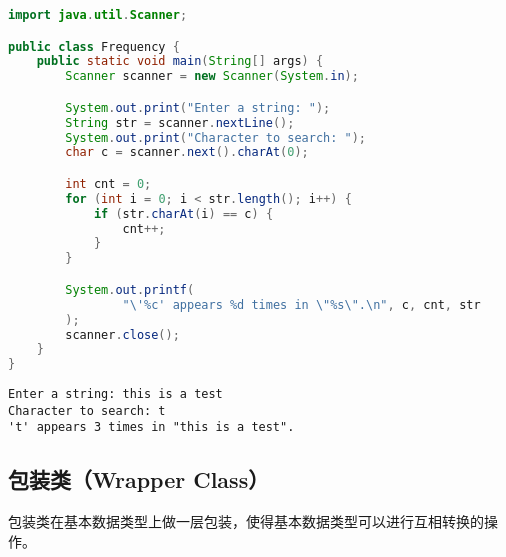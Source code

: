 \begin{lstlisting}[language=Java]
import java.util.Scanner;

public class Frequency {
	public static void main(String[] args) {
		Scanner scanner = new Scanner(System.in);

		System.out.print("Enter a string: ");
		String str = scanner.nextLine();
		System.out.print("Character to search: ");
		char c = scanner.next().charAt(0);

		int cnt = 0;
		for (int i = 0; i < str.length(); i++) {
			if (str.charAt(i) == c) {
				cnt++;
			}
		}

		System.out.printf(
				"\'%c' appears %d times in \"%s\".\n", c, cnt, str
		);
		scanner.close();
	}
}
\end{lstlisting}

\begin{tcolorbox}
	\begin{verbatim}
Enter a string: this is a test
Character to search: t
't' appears 3 times in "this is a test".
	\end{verbatim}
\end{tcolorbox}

\vspace{0.5cm}

\subsection{包装类（Wrapper Class）}

包装类在基本数据类型上做一层包装，使得基本数据类型可以进行互相转换的操作。\\

\begin{table}[H]
	\centering
	\caption{包装类}
\end{table}

